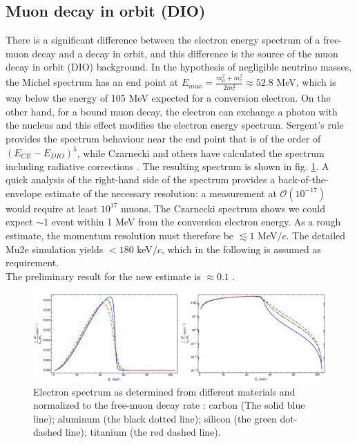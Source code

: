 \documentclass[12pt,a4paper,openright, oneside, titlepage]{book} %
\begin{document}
\subsection{Muon decay in orbit (DIO)}
There is a significant difference between the electron energy spectrum of a free-muon decay and a decay in orbit, and this difference is the source of the muon decay in orbit (DIO) background.
In the hypothesis of negligible neutrino masses, the Michel spectrum has an end point at $E_{max}=\frac{m_\mu^2+m_e^2}{2m_e^2}\approx52.8$ MeV, which is way below the energy of 105 MeV expected for a conversion electron.
On the other hand, for a bound muon decay, the electron can exchange a photon with the nucleus and this effect modifies the electron energy spectrum. 
Sergent's rule provides the spectrum behaviour near the end point that is of the order of $(E_{CE}-E_{DIO})^5$, while Czarnecki and others have calculated the spectrum including radiative corrections \cite{Czarnecki} \cite{Czarnecki2015}.
The resulting spectrum is shown in fig. \ref{_DIO}.
A quick analysis of the right-hand side of the spectrum provides a back-of-the-envelope estimate of the necessary resolution: a measurement at $\mathcal{O}(10^{-17})$ would require at least $10^{17}$ muons. 
The Czarnecki spectrum shows we could expect $\sim1$ event within 1 MeV from the conversion electron energy. 
As a rough estimate, the momentum resolution must therefore be $\lesssim1$ MeV$/c$. 
The detailed Mu2e simulation yields $<180$ keV$/c$, which in the following is assumed as requirement. \\
The preliminary result for the new estimate is $\approx0.1$ \cite{DIO_now}.\\

\begin{figure}[h!]
\centering
\includegraphics[scale=0.8]{DIO_materials}
\caption[Decay In Orbit spectra]{Electron spectrum as determined from different materials and normalized to the free-muon decay rate \cite{Signorelli}: carbon (The solid blue line); aluminum (the black dotted line); silicon (the green dot-dashed line); titanium (the red dashed line).}
\label{_DIO}
\end{figure}
\end{document}
